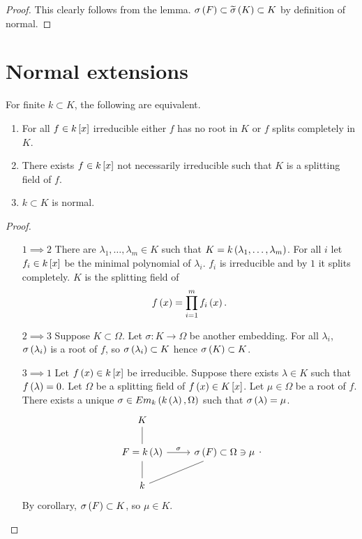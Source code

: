 \begin{proof}
This clearly follows from the lemma. $ \sigma\rb{F} \subset \widetilde{\sigma}\rb{K} \subset K $ by definition of normal.
\end{proof}

\pagebreak

\section{Normal extensions}

\begin{theorem}
For finite $ k \subset K $, the following are equivalent.
\begin{enumerate}
\item For all $ f \in k\sb{x} $ irreducible either $ f $ has no root in $ K $ or $ f $ splits completely in $ K $.
\item There exists $ f \in k\sb{x} $ not necessarily irreducible such that $ K $ is a splitting field of $ f $.
\item $ k \subset K $ is normal.
\end{enumerate}
\end{theorem}

\begin{proof}
\hfill
\begin{itemize}[leftmargin=0.5in]
\item[$ 1 \implies 2 $] There are $ \lambda_1, \dots, \lambda_m \in K $ such that $ K = k\rb{\lambda_1, \dots, \lambda_m} $. For all $ i $ let $ f_i \in k\sb{x} $ be the minimal polynomial of $ \lambda_i $. $ f_i $ is irreducible and by $ 1 $ it splits completely. $ K $ is the splitting field of
$$ f\rb{x} = \prod_{i = 1}^m f_i\rb{x}. $$
\item[$ 2 \implies 3 $] Suppose $ K \subset \Omega $. Let $ \sigma : K \to \Omega $ be another embedding. For all $ \lambda_i $, $ \sigma\rb{\lambda_i} $ is a root of $ f $, so $ \sigma\rb{\lambda_i} \subset K $ hence $ \sigma\rb{K} \subset K $.
\item[$ 3 \implies 1 $] Let $ f\rb{x} \in k\sb{x} $ be irreducible. Suppose there exists $ \lambda \in K $ such that $ f\rb{\lambda} = 0 $. Let $ \Omega $ be a splitting field of $ f\rb{x} \in K\sb{x} $. Let $ \mu \in \Omega $ be a root of $ f $. There exists a unique $ \sigma \in Em_k\rb{k\rb{\lambda}, \Omega} $ such that $ \sigma\rb{\lambda} = \mu $.
$$
\begin{tikzcd}
K & \\
F = k\rb{\lambda} \arrow[dash]{u} \arrow{r}{\sigma} & \sigma\rb{F} \subset \Omega \ni \mu \\
k \arrow[dash]{u} \arrow[dash]{ur} &
\end{tikzcd}.
$$
By corollary, $ \sigma\rb{F} \subset K $, so $ \mu \in K $.
\end{itemize}
\end{proof}

